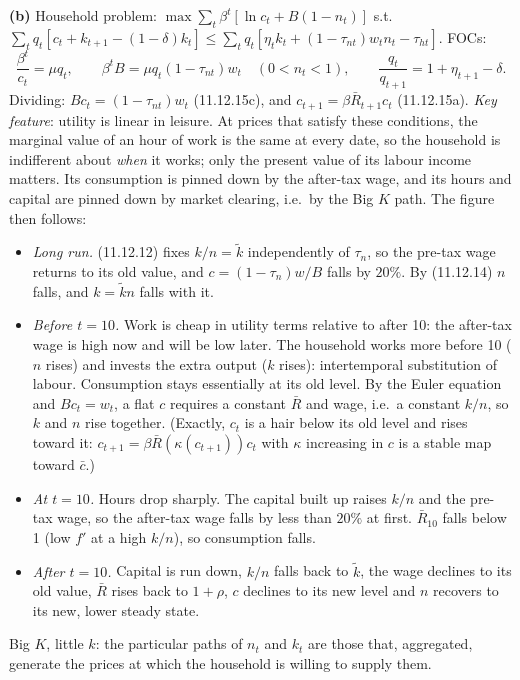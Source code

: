 \documentclass[12pt, letterpaper]{article}
\newcommand{\Rb}{\bar R}
\newcommand{\cb}{\bar c}
\begin{document}
\begin{tcolorbox}[evenbox,title={Exercise 11.20 \quad The invisible hand, II}]
\textbf{(b)} Household problem:
$\max\sum_t\beta^t[\ln c_t+B(1-n_t)]$ s.t. $\sum_tq_t[c_t+k_{t+1}-(1-\delta)k_t]\le\sum_tq_t[\eta_tk_t+(1-\tau_{nt})w_tn_t-\tau_{ht}]$.
FOCs:
\[
\frac{\beta^t}{c_t}=\mu q_t,\qquad \beta^tB=\mu q_t(1-\tau_{nt})w_t\quad(0<n_t<1),\qquad
\frac{q_t}{q_{t+1}}=1+\eta_{t+1}-\delta .
\]
Dividing: $Bc_t=(1-\tau_{nt})w_t$ (11.12.15c), and $c_{t+1}=\beta\Rb_{t+1}c_t$ (11.12.15a).
\emph{Key feature}: utility is linear in leisure. At prices that satisfy these conditions, the marginal value of an hour of work
is the same at every date, so the household is indifferent about \emph{when} it works; only the present value of its labour
income matters. Its consumption is pinned down by the after-tax wage, and its hours and capital are pinned down by market
clearing, i.e.\ by the Big $K$ path. The figure then follows:
\begin{itemize}[itemsep=2pt]
\item \emph{Long run.} (11.12.12) fixes $k/n=\tilde k$ independently of $\tau_n$, so the pre-tax wage returns to its old
value, and $c=(1-\tau_n)w/B$ falls by $20\%$. By (11.12.14) $n$ falls, and $k=\tilde kn$ falls with it.
\item \emph{Before $t=10$.} Work is cheap in utility terms relative to after 10: the after-tax wage is high now and will be
low later. The household works more before 10 ($n$ rises) and invests the extra output ($k$ rises): intertemporal
substitution of labour. Consumption stays essentially at its old level. By the Euler equation and $Bc_t=w_t$, a flat $c$
requires a constant $\Rb$ and wage, i.e.\ a constant $k/n$, so $k$ and $n$ rise together. (Exactly, $c_t$ is a hair below
its old level and rises toward it: $c_{t+1}=\beta\Rb(\kappa(c_{t+1}))c_t$ with $\kappa$ increasing in $c$ is a stable map
toward $\cb$.)
\item \emph{At $t=10$.} Hours drop sharply. The capital built up raises $k/n$ and the pre-tax wage, so the after-tax wage
falls by less than $20\%$ at first. $\Rb_{10}$ falls below 1 (low $f'$ at a high $k/n$), so consumption falls.
\item \emph{After $t=10$.} Capital is run down, $k/n$ falls back to $\tilde k$, the wage declines to its old value, $\Rb$
rises back to $1+\rho$, $c$ declines to its new level and $n$ recovers to its new, lower steady state.
\end{itemize}
Big $K$, little $k$: the particular paths of $n_t$ and $k_t$ are those that, aggregated, generate the prices at which the
household is willing to supply them.


\end{tcolorbox}
\end{document}
